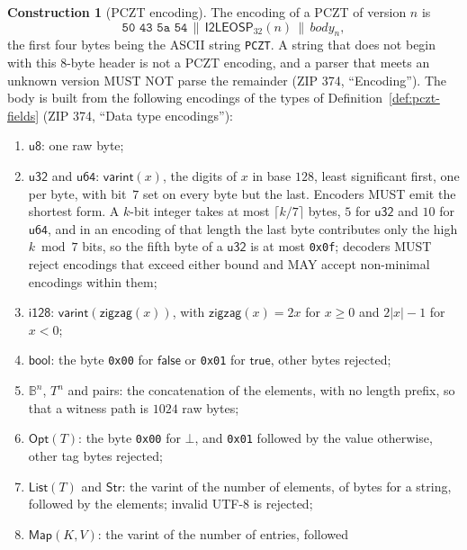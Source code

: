 \documentclass[11pt,a4paper]{article}
\theoremstyle{definition}
\newtheorem{construction}[theorem]{Construction}
\begin{document}
\begin{construction}[PCZT encoding]\label{def:pczt-encoding}
The encoding of a PCZT of version $n$ is
\[
  \texttt{50 43 5a 54} \,\|\, \mathsf{I2LEOSP}_{32}(n) \,\|\,
  \mathit{body}_n,
\]
the first four bytes being the ASCII string \texttt{PCZT}. A string that
does not begin with this $8$-byte header is not a PCZT encoding, and a
parser that meets an unknown version MUST NOT parse the remainder (ZIP 374,
``Encoding''). The body is built from the following encodings of the types
of Definition~\ref{def:pczt-fields} (ZIP 374, ``Data type encodings''):
\begin{enumerate}[label=(\roman*)]
\item $\mathsf{u8}$: one raw byte;
\item $\mathsf{u32}$ and $\mathsf{u64}$: $\mathsf{varint}(x)$, the digits
  of $x$ in base $128$, least significant first, one per byte, with bit~$7$
  set on every byte but the last. Encoders MUST emit the shortest form. A
  $k$-bit integer takes at most $\lceil k/7 \rceil$ bytes, $5$ for
  $\mathsf{u32}$ and $10$ for $\mathsf{u64}$, and in an encoding of that
  length the last byte contributes only the high $k \bmod 7$ bits, so the
  fifth byte of a $\mathsf{u32}$ is at most \texttt{0x0f}; decoders MUST
  reject encodings that exceed either bound and MAY accept non-minimal
  encodings within them;
\item $\mathsf{i128}$: $\mathsf{varint}(\mathsf{zigzag}(x))$, with
  $\mathsf{zigzag}(x) = 2x$ for $x \ge 0$ and $2|x| - 1$ for $x < 0$;
\item $\mathsf{bool}$: the byte \texttt{0x00} for $\mathsf{false}$ or
  \texttt{0x01} for $\mathsf{true}$, other bytes rejected;
\item $\mathbb{B}^{n}$, $T^{n}$ and pairs: the concatenation of the
  elements, with no length prefix, so that a witness path is $1024$ raw
  bytes;
\item $\mathsf{Opt}(T)$: the byte \texttt{0x00} for $\bot$, and
  \texttt{0x01} followed by the value otherwise, other tag bytes rejected;
\item $\mathsf{List}(T)$ and $\mathsf{Str}$: the varint of the number of
  elements, of bytes for a string, followed by the elements; invalid UTF-8
  is rejected;
\item $\mathsf{Map}(K, V)$: the varint of the number of entries, followed

\end{enumerate}
\end{construction}
\end{document}

